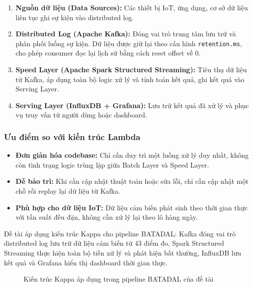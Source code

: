 \begin{enumerate}[label=\arabic*.]
  \item \textbf{Nguồn dữ liệu (Data Sources):} Các thiết bị IoT, ứng dụng, cơ sở
    dữ liệu liên tục ghi sự kiện vào distributed log.
  \item \textbf{Distributed Log (Apache Kafka):} Đóng vai trò trung tâm lưu trữ
    và phân phối luồng sự kiện. Dữ liệu được giữ lại theo cấu hình
    \texttt{retention.ms}, cho phép consumer đọc lại lịch sử bằng cách reset
    offset về 0.
  \item \textbf{Speed Layer (Apache Spark Structured Streaming):} Tiêu thụ dữ liệu
    từ Kafka, áp dụng toàn bộ logic xử lý và tính toán kết quả, ghi kết quả vào
    Serving Layer.
  \item \textbf{Serving Layer (InfluxDB + Grafana):} Lưu trữ kết quả đã xử lý và
    phục vụ truy vấn từ người dùng hoặc dashboard.
\end{enumerate}

\subsubsection{Ưu điểm so với kiến trúc Lambda}

\begin{itemize}
  \item \textbf{Đơn giản hóa codebase:} Chỉ cần duy trì một luồng xử lý duy nhất,
    không còn tình trạng logic trùng lặp giữa Batch Layer và Speed Layer.
  \item \textbf{Dễ bảo trì:} Khi cần cập nhật thuật toán hoặc sửa lỗi, chỉ cần
    cập nhật một chỗ rồi replay lại dữ liệu từ Kafka.
  \item \textbf{Phù hợp cho dữ liệu IoT:} Dữ liệu cảm biến phát sinh theo thời
    gian thực với tần suất đều đặn, không cần xử lý lại theo lô hàng ngày.
\end{itemize}

Đề tài áp dụng kiến trúc Kappa cho pipeline BATADAL: Kafka đóng vai trò distributed
log lưu trữ dữ liệu cảm biến từ 43 điểm đo, Spark Structured Streaming thực hiện
toàn bộ tiền xử lý và phát hiện bất thường, InfluxDB lưu kết quả và Grafana hiển
thị dashboard thời gian thực.

\begin{figure}[H]
  \centering
  \setlength{\fboxsep}{12pt}
  \caption{Kiến trúc Kappa áp dụng trong pipeline BATADAL của đề tài}
  \label{fig:kappa-pipeline}
\end{figure}

